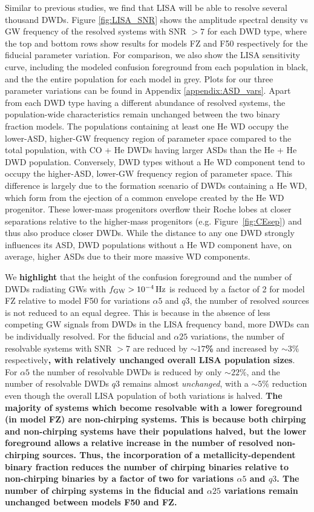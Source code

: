 \documentclass[twocolumn, linenumbers]{aastex631}
\begin{document}
Similar to previous studies, we find that LISA will be able to resolve several thousand DWDs. Figure \ref{fig:LISA_SNR} shows the amplitude spectral density vs GW frequency of the resolved systems with SNR $> 7$ for each DWD type, where the top and bottom rows show results for models FZ and F50 respectively for the fiducial parameter variation. For comparison, we also show the LISA sensitivity curve, including the 
modeled confusion foreground from each population in black, and the the entire population for each model in grey. Plots for our three parameter variations can be found in Appendix \ref{appendix:ASD_vars}. Apart from each DWD type having a different abundance of resolved systems, the population-wide characteristics remain unchanged between the two binary fraction models. The populations containing at least one He WD occupy the lower-ASD, higher-GW frequency region of parameter space compared to the total population, with CO + He DWDs having larger ASDs than the He + He DWD population. Conversely, DWD types without a He WD component tend to occupy the higher-ASD, lower-GW frequency region of parameter space. This difference is largely due to the formation scenario of DWDs containing a He WD, which form from the ejection of a common envelope created by the He WD progenitor. These lower-mass progenitors overflow their Roche lobes at closer separations relative to the higher-mass progenitors (e.g. Figure~\ref{fig:CEsep}) and thus also produce closer DWDs. While the distance to any one DWD strongly influences its ASD, DWD populations without a He WD component have, on average, higher ASDs due to their more massive WD components.


We \textbf{highlight} that the height of the confusion foreground and the number of DWDs radiating GWs with $f_{\rm{GW}} > 10^{-4}\,\rm{Hz}$ is reduced by a factor of 2 for model FZ relative to model F50 for variations $\alpha5$ and $q3$, the number of resolved sources is not reduced to an equal degree. This is because in the absence of less competing GW signals from DWDs in the LISA frequency band, more DWDs can be individually resolved. For the fiducial and $\alpha25$ variations, the number of resolvable systems with SNR $>7$ are reduced by \textbf{$\sim 17$\%} and increased by \textbf{$\sim3\%$} respectively\textbf{, with relatively unchanged overall LISA population sizes}. For $\alpha5$ the number of resolvable DWDs is reduced by only \textbf{$\sim 22\%$}, and the number of resolvable DWDs $q3$ remains almost \emph{unchanged}, with a \textbf{$\sim 5\%$} reduction even though the overall LISA population of both variations is halved. \textbf{The majority of systems which become resolvable with a lower foreground (in model FZ) are non-chirping systems. This is because both chirping and non-chirping systems have their populations halved, but the lower foreground allows a relative increase in the number of resolved non-chirping sources. Thus, the incorporation of a metallicity-dependent binary fraction reduces the number of chirping binaries relative to non-chirping binaries by a factor of two for variations $\alpha5$ and $q3$. The number of chirping systems in the fiducial and $\alpha25$ variations remain unchanged between models F50 and FZ.} 
\end{document}
